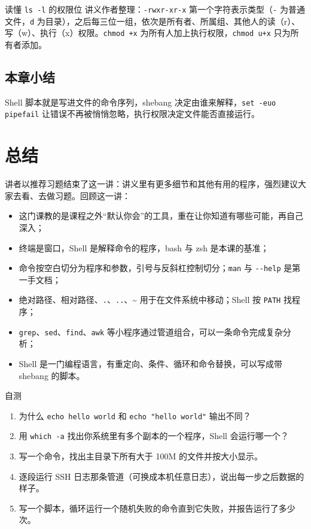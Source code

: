 \documentclass[a4paper]{article}
\begin{document}
\begin{practicebox}{读懂 \texttt{ls -l} 的权限位}
讲义作者整理：\texttt{-rwxr-xr-x} 第一个字符表示类型（\texttt{-} 为普通文件，\texttt{d} 为目录），之后每三位一组，依次是所有者、所属组、其他人的读（r）、写（w）、执行（x）权限。\texttt{chmod +x} 为所有人加上执行权限，\texttt{chmod u+x} 只为所有者添加。
\end{practicebox}

\subsection{本章小结}

Shell 脚本就是写进文件的命令序列，shebang 决定由谁来解释，\texttt{set -euo pipefail} 让错误不再被悄悄忽略，执行权限决定文件能否直接运行。

\section{总结}

讲者以推荐习题结束了这一讲：讲义里有更多细节和其他有用的程序，强烈建议大家去看、去做习题。回顾这一讲：
\begin{itemize}
\item 这门课教的是课程之外“默认你会”的工具，重在让你知道有哪些可能，再自己深入；
\item 终端是窗口，Shell 是解释命令的程序，bash 与 zsh 是本课的基准；
\item 命令按空白切分为程序和参数，引号与反斜杠控制切分；\texttt{man} 与 \texttt{-{}-help} 是第一手文档；
\item 绝对路径、相对路径、\texttt{.}、\texttt{..}、\textasciitilde{} 用于在文件系统中移动；Shell 按 \texttt{PATH} 找程序；
\item \texttt{grep}、\texttt{sed}、\texttt{find}、\texttt{awk} 等小程序通过管道组合，可以一条命令完成复杂分析；
\item Shell 是一门编程语言，有重定向、条件、循环和命令替换，可以写成带 shebang 的脚本。
\end{itemize}

\begin{practicebox}{自测}
\begin{enumerate}
\item 为什么 \texttt{echo hello      world} 和 \texttt{echo "hello      world"} 输出不同？
\item 用 \texttt{which -a} 找出你系统里有多个副本的一个程序，Shell 会运行哪一个？
\item 写一个命令，找出主目录下所有大于 100M 的文件并按大小显示。
\item 逐段运行 SSH 日志那条管道（可换成本机任意日志），说出每一步之后数据的样子。
\item 写一个脚本，循环运行一个随机失败的命令直到它失败，并报告运行了多少次。
\end{enumerate}
\end{practicebox}
\end{document}
